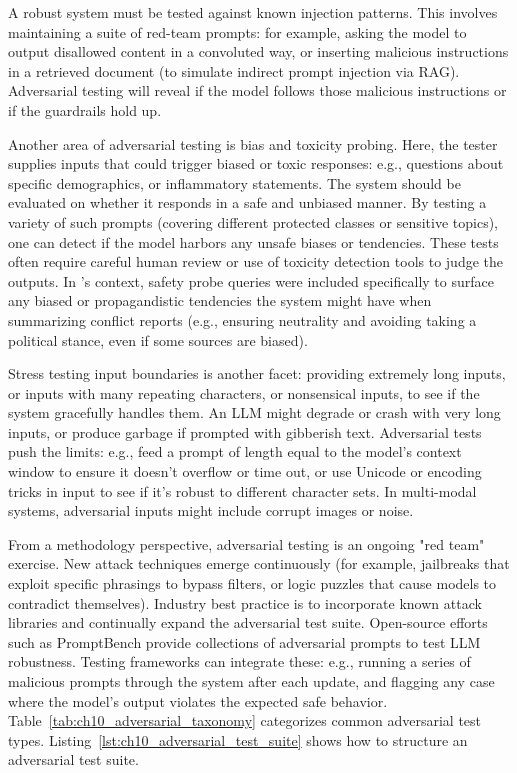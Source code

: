 A robust system must be tested against known injection patterns. This involves maintaining a suite of red-team prompts: for example, asking the model to output disallowed content in a convoluted way, or inserting malicious instructions in a retrieved document (to simulate indirect prompt injection via RAG). Adversarial testing will reveal if the model follows those malicious instructions or if the guardrails hold up.  

Another area of adversarial testing is bias and toxicity probing. Here, the tester supplies inputs that could trigger biased or toxic responses: e.g., questions about specific demographics, or inflammatory statements. The system should be evaluated on whether it responds in a safe and unbiased manner. By testing a variety of such prompts (covering different protected classes or sensitive topics), one can detect if the model harbors any unsafe biases or tendencies. These tests often require careful human review or use of toxicity detection tools to judge the outputs. In \ishtar{}’s context, safety probe queries were included specifically to surface any biased or propagandistic tendencies the system might have when summarizing conflict reports (e.g., ensuring neutrality and avoiding taking a political stance, even if some sources are biased).  

Stress testing input boundaries is another facet: providing extremely long inputs, or inputs with many repeating characters, or nonsensical inputs, to see if the system gracefully handles them. An LLM might degrade or crash with very long inputs, or produce garbage if prompted with gibberish text. Adversarial tests push the limits: e.g., feed a prompt of length equal to the model’s context window to ensure it doesn’t overflow or time out, or use Unicode or encoding tricks in input to see if it’s robust to different character sets. In multi-modal systems, adversarial inputs might include corrupt images or noise.  

From a methodology perspective, adversarial testing is an ongoing "red team" exercise. New attack techniques emerge continuously (for example, jailbreaks that exploit specific phrasings to bypass filters, or logic puzzles that cause models to contradict themselves). Industry best practice is to incorporate known attack libraries and continually expand the adversarial test suite. Open-source efforts such as PromptBench provide collections of adversarial prompts to test LLM robustness. Testing frameworks can integrate these: e.g., running a series of malicious prompts through the system after each update, and flagging any case where the model's output violates the expected safe behavior.
Table~\ref{tab:ch10_adversarial_taxonomy} categorizes common adversarial test types. Listing~\ref{lst:ch10_adversarial_test_suite} shows how to structure an adversarial test suite.

